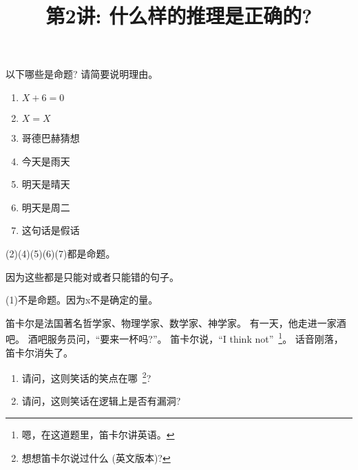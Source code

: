 \documentclass[a4paper, justified]{tufte-handout}
\title{第2讲: 什么样的推理是正确的?}
\date{\zhtoday} %
\begin{document}
\maketitle
\noplagiarism %
\begin{abstract}
  \begin{center}{}
  \end{center}
\end{abstract}
\beginrequired

\begin{problem}
以下哪些是命题? 请简要说明理由。

\begin{enumerate}[(1)]
  \item $X + 6 = 0$
  \item $X = X$
  \item 哥德巴赫猜想
  \item 今天是雨天
  \item 明天是晴天
  \item 明天是周二
  \item 这句话是假话
\end{enumerate}
\end{problem}

\begin{solution}
  (2)(4)(5)(6)(7)都是命题。

  因为这些都是只能对或者只能错的句子。

  (1)不是命题。因为x不是确定的量。
\end{solution}

\begin{problem}
笛卡尔是法国著名哲学家、物理学家、数学家、神学家。
有一天，他走进一家酒吧。
酒吧服务员问，``要来一杯吗?''。
笛卡尔说，``I think not''~\footnote{嗯，在这道题里，笛卡尔讲英语。}。
话音刚落，笛卡尔消失了。

\begin{enumerate}[(1)]
  \item 请问，这则笑话的笑点在哪~\footnote{想想笛卡尔说过什么 (英文版本)?}?
  \item 请问，这则笑话在逻辑上是否有漏洞?
\end{enumerate}
\end{problem}
\end{document}
